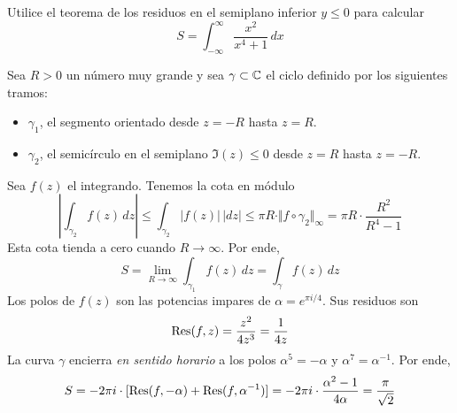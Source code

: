 \begin{exercise}
Utilice el teorema de los residuos en el semiplano inferior $y \le 0$ para calcular
$$S = \int_{-\infty}^\infty \frac {x^2} {x^4 + 1} \, dx$$
\end{exercise}

\begin{solution}
Sea $R > 0$ un número muy grande y sea $\gamma \subset \mathbb C$ el ciclo definido por los siguientes tramos:
\begin{itemize}
    \item $\gamma_1$, el segmento orientado desde $z = -R$ hasta $z = R$.
    \item $\gamma_2$, el semicírculo en el semiplano $\Im(z) \le 0$ desde $z = R$ hasta $z = -R$.
\end{itemize}
Sea $f(z)$ el integrando. Tenemos la cota en módulo
$$
\left| \int_{\gamma_2} f(z) \, dz \right|
    \le \int_{\gamma_2} \left| f(z) \right| \, |dz|
    \le \pi R \cdot \Vert f \circ \gamma_2 \Vert_\infty
    = \pi R \cdot \frac {R^2} {R^4 - 1}
$$
Esta cota tienda a cero cuando $R \to \infty$. Por ende,
$$S = \lim_{R \to \infty} \int_{\gamma_1} f(z) \, dz = \int_\gamma f(z) \, dz$$
Los polos de $f(z)$ son las potencias impares de $\alpha = e^{\pi i/4}$. Sus residuos son
$$\operatorname{Res}(f, z) = \frac {z^2} {4z^3} = \frac 1 {4z}$$
La curva $\gamma$ encierra \textit{en sentido horario} a los polos $\alpha^5 = -\alpha$ y $\alpha^7 = \alpha^{-1}$. Por ende,
$$
S
    = -2\pi i \cdot [\operatorname{Res}(f, -\alpha) + \operatorname{Res}(f, \alpha^{-1})]
    = -2\pi i \cdot \frac {\alpha^2 - 1} {4\alpha}
    = \frac \pi {\sqrt 2}
$$
\end{solution}
